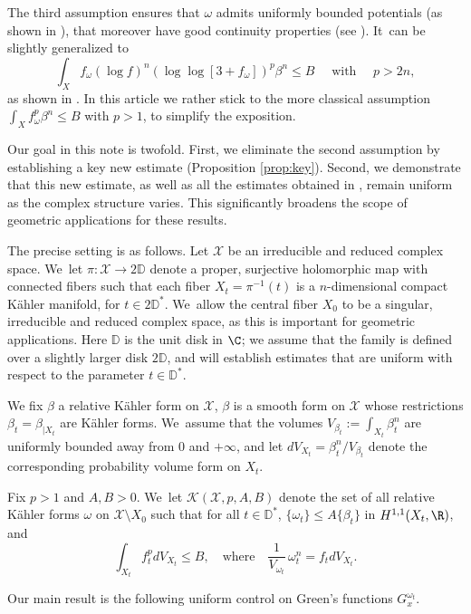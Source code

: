 The third assumption ensures that $\omega$ admits uniformly bounded potentials
(as shown in \cite{Kol98,EGZ08,DP10}), that moreover
have good continuity properties (see \cite{Kol08,DDGHKZ14,GPTW21,GGZ23}). It~can be slightly generalized to
\[
\int_X f_{\omega} (\log f)^n (\log \log [3+f_{\omega}])^p \beta^n \leq B
\quad \text{ with } \quad
p>2n,
\]
as shown in \cite{GGZ23}. In this article we rather stick to the more classical assumption
$\int_X f_{\omega}^p \beta^n \leq B$ with $p>1$, to simplify the exposition.

Our goal in this note is twofold.
First, we eliminate the second assumption by establishing a key new estimate (Proposition \ref{prop:key}).
Second, we demonstrate that this new estimate, as well as all the estimates obtained in \cite{GPS22,GPSS22,GPSS23},
remain uniform as the complex structure varies.
This significantly broadens the scope of geometric applications for these results.

The precise setting is as follows.
Let $\mathcal{X}$ be an irreducible and reduced complex space. We~let $\pi:{\mathcal X} \rightarrow 2 \mathbb D$
denote a proper, surjective holomorphic map with connected fibers such that each fiber $X_t=\pi^{-1}(t)$ is a $n$-dimensional
compact Kähler manifold, for $t\in 2 \mathbb D^*$. We~allow the central fiber $X_0$ to be a singular, irreducible and reduced complex space, as this is important for geometric applications.
Here $\mathbb D$ is the unit disk in $\C$; we assume that the family is defined over a slightly larger disk
$2 \mathbb D$, and will establish estimates that are uniform with respect to the parameter $t \in \mathbb D^*$.

We fix $\beta$ a relative Kähler form on $\mathcal{X}$, \ie
$\beta$ is a smooth form on $\mathcal{X}$ whose restrictions $\beta_t=\beta_{|X_t}$ are Kähler forms. We~assume that the volumes $V_{\beta_t}:=\int_{X_t} \beta_t^n$ are uniformly bounded away from 0 and $+ \infty $, and let $dV_{X_t}=\beta_t^n /V_{\beta_t}$ denote the corresponding probability volume form on $X_t$.

Fix $p>1$ and $A,B>0$. We~let ${\mathcal K}(\mathcal{X},p,A,B)$ denote the set of all relative Kähler forms $\omega$ on
$\mathcal{X}\setminus X_0 $ such that for all $t \in \mathbb D^*$, $\{\omega_t\}\leq A\{\beta_t\}$ in $H^{1,1}(X_t,\R)$, and\vspace*{-3pt}
\[
\int_{X_t} f_t^p dV_{X_t} \leq B,
\quad \text{where} \quad
\frac{1}{V_{\omega_t}}\, \omega_t^n=f_t dV_{X_t}.
\]

Our main result is the following uniform control on Green's functions $G_x^{\omega_t}$.

